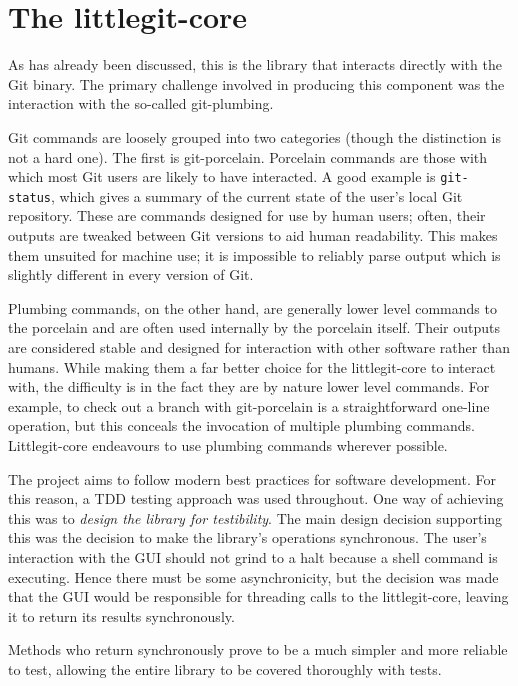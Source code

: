\section{The littlegit-core}

As has already been discussed, this is the library that interacts directly with the Git binary. The primary challenge involved in producing this component was the interaction with the so-called git-plumbing.

Git commands are loosely grouped into two categories (though the distinction is not a hard one). The first is git-porcelain. Porcelain commands are those with which most Git users are likely to have interacted. A good example is \texttt{git-status}, which gives a summary of the current state of the user's local Git repository. These are commands designed for use by human users; often, their outputs are tweaked between Git versions to aid human readability. This makes them unsuited for machine use; it is impossible to reliably parse output which is slightly different in every version of Git.

Plumbing commands, on the other hand, are generally lower level commands to the porcelain and are often used internally by the porcelain itself. Their outputs are considered stable and designed for interaction with other software rather than humans. While making them a far better choice for the littlegit-core to interact with, the difficulty is in the fact they are by nature lower level commands. For example, to check out a branch with git-porcelain is a straightforward one-line operation, but this conceals the invocation of multiple plumbing commands. Littlegit-core endeavours to use plumbing commands wherever possible.

The project aims to follow modern best practices for software development. For this reason, a TDD testing approach was used throughout. One way of achieving this was to \emph{design the library for testibility}. The main design decision supporting this was the decision to make the library's operations synchronous. The user's interaction with the GUI should not grind to a halt because a shell command is executing. Hence there must be some asynchronicity, but the decision was made that the GUI would be responsible for threading calls to the littlegit-core, leaving it to return its results synchronously.

Methods who return synchronously prove to be a much simpler and more reliable to test, allowing the entire library to be covered thoroughly with tests.

